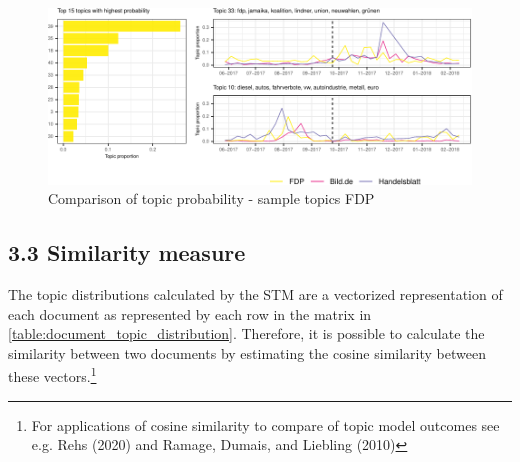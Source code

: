 \documentclass[
  12pt,
]{article}
\begin{document}
\begin{figure}

{\centering \includegraphics[width=1\linewidth]{chap1_files/figure-latex/Top FDP topics-1} 

}

\caption{Comparison of topic probability - sample topics FDP \label{fig:sample_topics_fdp}}\label{fig:Top FDP topics}
\end{figure}

\hypertarget{similarity-measure}{%
\subsection{3.3 Similarity measure}\label{similarity-measure}}

The topic distributions calculated by the STM are a vectorized
representation of each document as represented by each row in the matrix
in \autoref{table:document_topic_distribution}. Therefore, it is
possible to calculate the similarity between two documents by estimating
the cosine similarity between these vectors.\footnote{For applications
  of cosine similarity to compare of topic model outcomes see e.g. Rehs
  (2020) and Ramage, Dumais, and Liebling (2010)}
\end{document}
